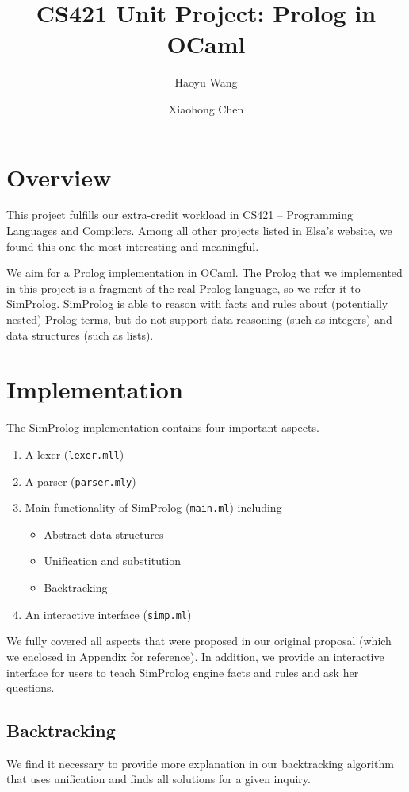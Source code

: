 \documentclass{article}
\title{CS421 Unit Project: Prolog in OCaml}
\author{Haoyu Wang  \and Xiaohong Chen}
\begin{document}
\maketitle

\section{Overview}

This project fulfills our extra-credit workload in CS421 -- Programming Languages and Compilers. Among all other projects listed in Elsa's website, we found this one the most interesting and meaningful.

We aim for a Prolog implementation in OCaml. The Prolog that we implemented in this project is a fragment of the real Prolog language, so we refer it to SimProlog. SimProlog is able to reason with facts and rules about (potentially nested) Prolog terms, but do not support data reasoning (such as integers) and data structures (such as lists). 

\section{Implementation}

The SimProlog implementation contains four important aspects.
\begin{enumerate}
	\item A lexer ({\tt lexer.mll})
	\item A parser ({\tt parser.mly})
	\item Main functionality of SimProlog ({\tt main.ml}) including
	\begin{itemize}
		\item Abstract data structures
		\item Unification and substitution
		\item Backtracking
	\end{itemize}
	\item An interactive interface ({\tt simp.ml})
\end{enumerate}

We fully covered all aspects that were proposed in our original proposal (which we enclosed in Appendix for reference). In addition, we provide an interactive interface for users to teach SimProlog engine facts and rules and ask her questions.

\subsection{Backtracking}
We find it necessary to provide more explanation in our backtracking algorithm that uses unification and finds all solutions for a given inquiry.
\end{document}
